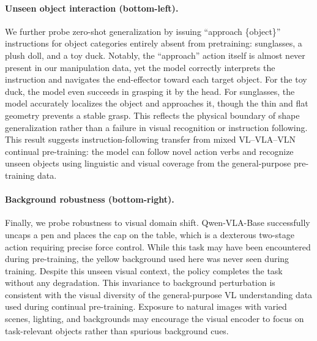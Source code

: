 \paragraph{Unseen object interaction (bottom-left).}
We further probe zero-shot generalization by issuing ``approach \{object\}'' instructions for object categories entirely absent from pretraining: sunglasses, a plush doll, and a toy duck.
Notably, the ``approach'' action itself is almost never present in our manipulation data, yet the model correctly interprets the instruction and navigates the end-effector toward each target object.
For the toy duck, the model even succeeds in grasping it by the head.
For sunglasses, the model accurately localizes the object and approaches it, though the thin and flat geometry prevents a stable grasp. This reflects the physical boundary of shape generalization rather than a failure in visual recognition or instruction following.
This result suggests instruction-following transfer from mixed VL--VLA--VLN continual pre-training: the model can follow novel action verbs and recognize unseen objects using linguistic and visual coverage from the general-purpose pre-training data.

\paragraph{Background robustness (bottom-right).}
Finally, we probe robustness to visual domain shift.
Qwen-VLA-Base successfully uncaps a pen and places the cap on the table, which is a dexterous two-stage action requiring precise force control.
While this task may have been encountered during pre-training, the yellow background used here was never seen during training.
Despite this unseen visual context, the policy completes the task without any degradation.
This invariance to background perturbation is consistent with the visual diversity of the general-purpose VL understanding data used during continual pre-training. Exposure to natural images with varied scenes, lighting, and backgrounds may encourage the visual encoder to focus on task-relevant objects rather than spurious background cues.



